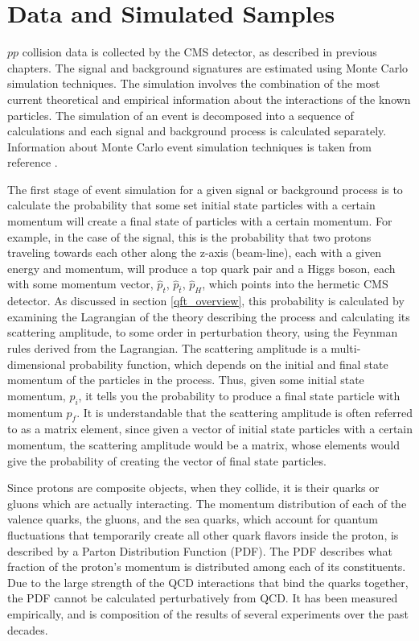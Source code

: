 \section{Data and Simulated Samples}
\label{data_and_mc_overview}

\par $pp$ collision data is collected by the CMS detector, as
described in previous chapters.  The signal and background signatures
are estimated using Monte Carlo simulation techniques.  The simulation
involves the combination of the most current theoretical and empirical
information about the interactions of the known particles.  The
simulation of an event is decomposed into a sequence of calculations and
each signal and background process is calculated separately.
Information about Monte Carlo event simulation techniques is taken
from reference \cite{Agashe:2014kda}.  

\par The first stage of event simulation for a given signal or
background process is to calculate the probability that some set
initial state particles with a certain momentum will create a final
state of particles with a certain momentum.  For example, in the case of
the \ttH signal, this is the probability that two protons traveling
towards each other along the z-axis (beam-line), each with a given
energy and momentum, will produce a top quark pair and a Higgs boson,
each with some momentum vector, $\hat{p}_{t}$, $\hat{p}_{\bar{t}}$,
$\hat{p}_{H}$, which points into the hermetic CMS detector.  As
discussed in section \ref{qft_overview}, this probability is calculated
by examining the Lagrangian of the theory describing the process and
calculating its scattering amplitude, to some order in perturbation
theory, using the Feynman rules derived from the Lagrangian.  The
scattering amplitude is a multi-dimensional probability function,
which depends on the initial and final state momentum of the particles
in the process.  Thus, given some initial state momentum, $p_{i}$, it tells you
the probability to produce a final state particle with momentum
$p_{f}$.  It is understandable that the scattering amplitude is
often referred to as a matrix element, since given a vector of initial
state particles with a certain momentum, the scattering amplitude
would be a matrix, whose elements would give the probability of
creating the vector of final state particles.  

\par Since protons are composite objects, when they
collide, it is their quarks or gluons which are actually interacting.
The momentum distribution of each of the valence quarks, the gluons,
and the sea quarks, which account for quantum fluctuations that
temporarily create all other quark flavors inside the proton, is described by
a Parton Distribution Function (PDF).  The PDF describes what fraction
of the proton's momentum is distributed among each of its
constituents.  Due to the large strength of the QCD interactions that
bind the quarks together, the PDF cannot be calculated perturbatively
from QCD.  It has been measured empirically, and is composition of the
results of several experiments over the past decades.  

